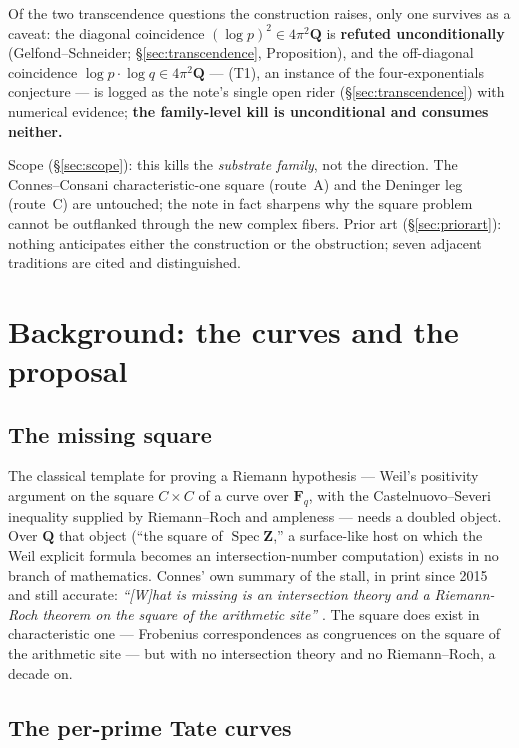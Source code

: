 \documentclass[11pt]{article}
\theoremstyle{definition}
\theoremstyle{remark}
\newcommand{\Z}{\mathbf{Z}}
\newcommand{\Q}{\mathbf{Q}}
\newcommand{\SpecZ}{\operatorname{Spec}\Z}
\begin{document}
Of the two transcendence questions the construction raises, only one survives
as a caveat: the diagonal coincidence $(\log p)^2 \in 4\pi^2\Q$ is
\textbf{refuted unconditionally} (Gelfond--Schneider;
\S\ref{sec:transcendence}, Proposition), and the off-diagonal coincidence
$\log p\cdot\log q \in 4\pi^2\Q$ --- (T1), an instance of the
four-exponentials conjecture --- is logged as the note's single open rider
(\S\ref{sec:transcendence}) with numerical evidence; \textbf{the family-level
kill is unconditional and consumes neither.}

Scope (\S\ref{sec:scope}): this kills the \emph{substrate family}, not the
direction. The Connes--Consani characteristic-one square (route~A) and the
Deninger leg (route~C) are untouched; the note in fact sharpens why the
square problem cannot be outflanked through the new complex fibers. Prior art
(\S\ref{sec:priorart}): nothing anticipates either the construction or the
obstruction; seven adjacent traditions are cited and distinguished.

\section{Background: the curves and the proposal}
\label{sec:background}

\subsection{The missing square}
\label{sec:missingsquare}

The classical template for proving a Riemann hypothesis --- Weil's positivity
argument on the square $C \times C$ of a curve over $\mathbf{F}_q$, with the
Castelnuovo--Severi inequality supplied by Riemann--Roch and ampleness ---
needs a doubled object. Over $\Q$ that object (``the square of $\SpecZ$,'' a
surface-like host on which the Weil explicit formula becomes an
intersection-number computation) exists in no branch of mathematics. Connes'
own summary of the stall, in print since 2015 and still accurate:
\emph{``[W]hat is missing is an intersection theory and a Riemann-Roch
theorem on the square of the arithmetic site''} \cite[\S4.3.2]{CE15}. The
square does exist in characteristic one --- Frobenius correspondences as
congruences on the square of the arithmetic site \cite{CC16} --- but with no
intersection theory and no Riemann--Roch, a decade on.

\subsection{The per-prime Tate curves}
\label{sec:tatecurves}
\end{document}
